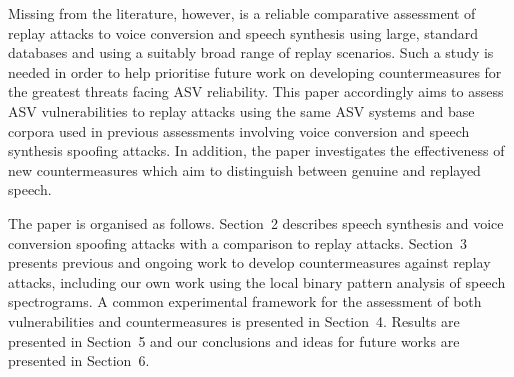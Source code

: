 
Missing from the literature, however, is a reliable comparative assessment 
of replay attacks to voice conversion and speech synthesis using large, 
standard databases and using a suitably broad range of replay scenarios. 
Such a study is needed in order to help prioritise future work on developing
countermeasures for the greatest threats facing ASV reliability.
This paper accordingly aims to assess ASV vulnerabilities 
to replay attacks using the same ASV systems and base corpora used in 
previous assessments involving voice conversion and speech synthesis 
spoofing attacks.  In addition, the paper investigates the effectiveness of 
new countermeasures which aim to distinguish between genuine and replayed speech.  

The paper is organised as follows.  Section~2 describes speech synthesis and voice conversion spoofing attacks with a comparison to replay attacks. Section~3 presents previous and ongoing work to develop countermeasures against replay attacks, including our own work using the local binary pattern analysis of speech spectrograms.  A common experimental framework for the assessment of both vulnerabilities and countermeasures is presented in Section~4. Results are presented in Section~5 and our conclusions and ideas for future works are presented in Section~6.
